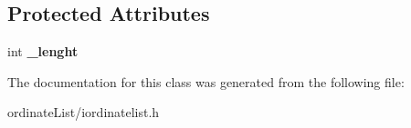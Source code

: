 \subsection*{Protected Attributes}
\begin{DoxyCompactItemize}
\item 
\hypertarget{class_i_ordinate_list_a28c0ecc93c212cf1fb6fa63a7227eb4a}{int {\bfseries \-\_\-lenght}}\label{class_i_ordinate_list_a28c0ecc93c212cf1fb6fa63a7227eb4a}

\end{DoxyCompactItemize}


The documentation for this class was generated from the following file\-:\begin{DoxyCompactItemize}
\item 
ordinate\-List/iordinatelist.\-h\end{DoxyCompactItemize}
